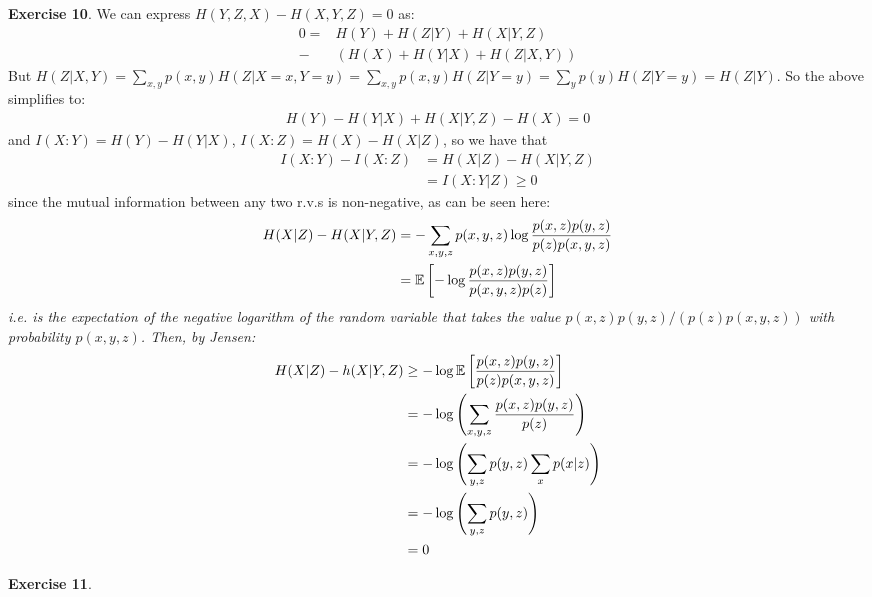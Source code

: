 \documentclass[]{article}
\begin{document}
\textbf{Exercise 10}. We can express $H(Y,Z,X) - H(X,Y,Z) = 0$ as:
\begin{align*}
    0 =& H(Y) + H(Z|Y) + H(X| Y,Z)\\
    -&(H(X) + H(Y|X) + H(Z|X,Y))
\end{align*}
But $H(Z|X,Y) = \sum_{x,y}p(x,y)H(Z|X=x,Y=y) = \sum_{x,y}p(x,y)H(Z|Y=y) = \sum_{y}p(y)H(Z|Y=y) = H(Z|Y)$. So the above simplifies to:
\begin{align*}
    H(Y) - H(Y|X) + H(X|Y,Z) - H(X) = 0
\end{align*}
and $I(X:Y) = H(Y) - H(Y|X)$, $I(X:Z) = H(X) - H(X|Z)$, so we have that 
\begin{align*}
    I(X:Y) - I(X:Z) &= H(X|Z) - H(X|Y,Z)\\
    & = I(X:Y|Z) \ge 0
\end{align*}
since the mutual information between any two r.v.s is non-negative, as can be seen here:
\begin{align*}
    H(X|Z) - H(X|Y,Z) & = -\sum_{x,y,z} p(x,y,z)\log \frac{p(x,z)p(y,z)}{p(z)p(x,y,z)}\\
    & = \mathbb{E}\left[ -\log \frac{p(x,z)p(y,z)}{p(x,y,z)p(z)}   \right]
\end{align*}
\it{i.e.} is the expectation of the negative logarithm of the random variable that takes the value $p(x,z)p(y,z)/(p(z)p(x,y,z))$ with probability $p(x,y,z)$. Then, by Jensen:
\begin{align*}
    H(X|Z) - h(X|Y,Z) & \ge -\log \mathbb{E} \left[  \frac{p(x,z)p(y,z)}{p(z)p(x,y,z)}  \right]\\
    & = -\log \left(  \sum_{x,y,z}\frac{p(x,z)p(y,z)}{p(z)}  \right)\\
    &= - \log \left (\sum_{y,z}p(y,z)\sum_{x}p(x|z)\right)\\
    & = -\log \left( \sum_{y,z}p(y,z)\right)\\
    &= 0
\end{align*}

\textbf{Exercise 11}.
\end{document}
